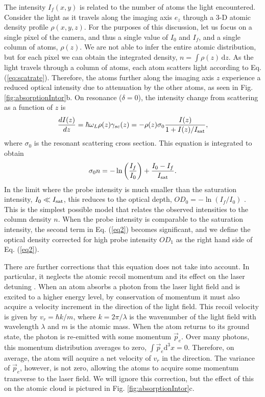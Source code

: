 \documentclass[12pt]{iopart}
\begin{document}
\par The intensity $I_f(x,y)$ is related to the number of atoms the light encountered. Consider the light as it travels along the imaging axis $e_z$ through a 3-D atomic density profile $\rho(x,y,z)$. For the purposes of this discussion, let us focus on a single pixel of the camera, and thus a single value of $I_0$ and $I_f$, and a single column of atoms, $\rho(z)$. We are not able to infer the entire atomic distribution, but for each pixel we can obtain the integrated density, $n = \int \rho\left(z\right) \,\mathrm{d}z$. As the light travels through a column of atoms, each atom scatters light according to Eq. (\ref{eq:scatrate}). Therefore, the atoms further along the imaging axis $z$ experience a reduced optical intensity due to attenuation by the other atoms, as seen in Fig. \ref{fig:absorptionIntor}b. On resonance ($\delta=0$), the intensity change from scattering as a function of $z$ is
\begin{equation}
\frac{dI(z)}{dz}=\hbar\omega_L\rho(z)\gamma_{sc}(z)=-\rho(z)\sigma_0\frac{I(z)}{1+I(z)/I_{\rm{sat}}},
\end{equation}
where $\sigma_0$ is the resonant scattering cross section. 
 This equation is integrated to obtain  \cite{Reinaudi07}
\begin{equation} 
\sigma_0 n = -\ln\left(\frac{I_f}{I_0}\right) + \frac{I_0-I_f}{I_{\rm{sat}}}.
\label{eq2}
\end{equation}
In the limit where the probe intensity is much smaller than the saturation intensity, $I_0\ll I_{\rm{sat}}$, this reduces to the optical depth, $OD_0=-\ln \left(I_f/I_0\right)$   \cite{Reinaudi07}. This is the simplest possible model that relates the observed intensities to the column density $n$. When the probe intensity is comparable to the saturation intensity, the second term in Eq. (\ref{eq2}) becomes significant, and we define the optical density corrected for high probe intensity $OD_1$ as the right hand side of Eq.  (\ref{eq2}).
\par There are further corrections that this equation does not take into account. In particular, it neglects the atomic recoil momentum and its effect on the laser detuning \cite{Konstantinidis12}. When an atom absorbs a photon from the laser light field and is excited to a higher energy level, by conservation of momentum it must also acquire a velocity increment in the direction of the light field. This recoil velocity is given by $v_r=\hbar k/m$, where $k=2\pi/\lambda$ is the wavenumber of the light field with wavelength $\lambda$ and $m$ is the atomic mass. When the atom returns to its ground state, the photon is re-emitted with some momentum $\vec{p}_e$. Over many photons, this momentum distribution averages to zero, $\int\vec{p}_e\mathrm{d}^3 x=0$. Therefore, on average, the atom  will acquire a net velocity of $v_r$ in the \ez{} direction.  The variance of $\vec{p}_e$, however, is not zero, allowing the atoms to acquire some momentum transverse to the laser field. We will ignore this correction, but the effect of this on the atomic cloud is pictured in Fig. \ref{fig:absorptionIntor}c. 
\end{document}
